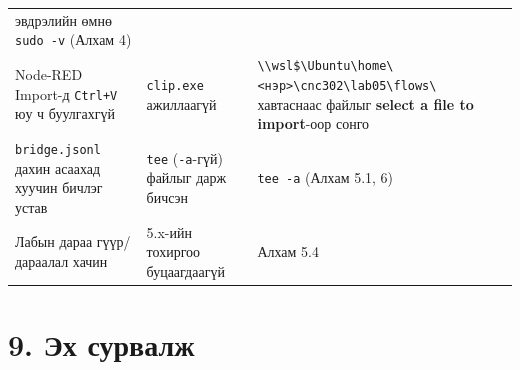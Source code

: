 \begin{longtable}[]{@{}lll@{}}
\begin{minipage}[t]{0.30\columnwidth}
эвдрэлийн өмнө \texttt{sudo\ -v} (Алхам 4)\strut
\end{minipage}\tabularnewline
\begin{minipage}[t]{0.30\columnwidth}\raggedright
Node-RED Import-д \texttt{Ctrl+V} юу ч буулгахгүй\strut
\end{minipage} & \begin{minipage}[t]{0.30\columnwidth}\raggedright
\texttt{clip.exe} ажиллаагүй\strut
\end{minipage} & \begin{minipage}[t]{0.30\columnwidth}\raggedright
\texttt{\textbackslash{}\allowbreak{}\textbackslash{}\allowbreak{}wsl\$\textbackslash{}\allowbreak{}Ubuntu\textbackslash{}\allowbreak{}home\textbackslash{}\allowbreak{}\textless{}нэр\textgreater{}\textbackslash{}\allowbreak{}cnc302\textbackslash{}\allowbreak{}lab05\textbackslash{}\allowbreak{}flows\textbackslash{}\allowbreak{}} хавтаснаас файлыг \textbf{select a file to import}-оор сонго\strut
\end{minipage}\tabularnewline
\begin{minipage}[t]{0.30\columnwidth}\raggedright
\texttt{bridge.jsonl} дахин асаахад хуучин бичлэг устав\strut
\end{minipage} & \begin{minipage}[t]{0.30\columnwidth}\raggedright
\texttt{tee} (\texttt{-a}-гүй) файлыг дарж бичсэн\strut
\end{minipage} & \begin{minipage}[t]{0.30\columnwidth}\raggedright
\texttt{tee\ -a} (Алхам 5.1, 6)\strut
\end{minipage}\tabularnewline
\begin{minipage}[t]{0.30\columnwidth}\raggedright
Лабын дараа гүүр/дараалал хачин\strut
\end{minipage} & \begin{minipage}[t]{0.30\columnwidth}\raggedright
5.x-ийн тохиргоо буцаагдаагүй\strut
\end{minipage} & \begin{minipage}[t]{0.30\columnwidth}\raggedright
Алхам 5.4\strut
\end{minipage}\tabularnewline
\bottomrule
\end{longtable}\endgroup

\hypertarget{ux44dux445-ux441ux443ux440ux432ux430ux43bux436}{%
\section{9. Эх сурвалж}\label{ux44dux445-ux441ux443ux440ux432ux430ux43bux436}}

